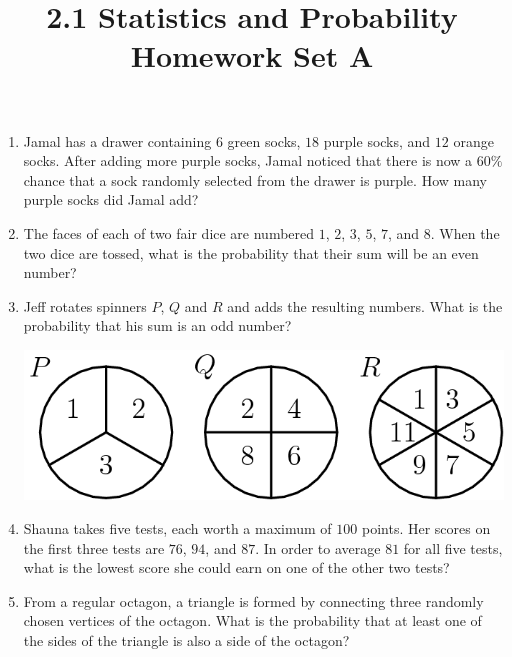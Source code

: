 \documentclass{article}
\title{2.1 Statistics and Probability Homework Set A}
\author{}
\date{}
\begin{document}
\maketitle

\begin{enumerate}[resume]
    \item Jamal has a drawer containing $6$ green socks, $18$ purple socks, and $12$ orange socks.
        After adding more purple socks, Jamal noticed that there is now a $60\%$ chance that a sock randomly selected from the drawer is purple.
        How many purple socks did Jamal add?
        \vspace{3cm}
    \item The faces of each of two fair dice are numbered $1$, $2$, $3$, $5$, $7$, and $8$.
        When the two dice are tossed, what is the probability that their sum will be an even number?
        \vspace{3cm}
    \item Jeff rotates spinners $P$, $Q$ and $R$ and adds the resulting numbers.
        What is the probability that his sum is an odd number?
        \begin{center}
            \includegraphics[scale=0.25]{spinners.png}
        \end{center}
        \vspace{2cm}
    \item Shauna takes five tests, each worth a maximum of $100$ points.
        Her scores on the first three tests are $76$, $94$, and $87$.
        In order to average $81$ for all five tests, what is the lowest score she could earn on one of the other two tests?
        \vspace{3cm}
    \item From a regular octagon, a triangle is formed by connecting three randomly chosen vertices of the octagon.
        What is the probability that at least one of the sides of the triangle is also a side of the octagon?
        \begin{center}

\end{center}
\end{enumerate}
\end{document}
